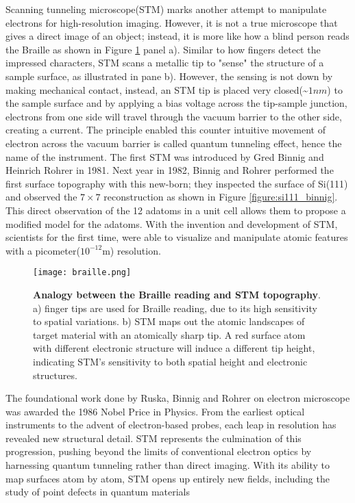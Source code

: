 Scanning tunneling microscope(STM) marks another attempt to manipulate electrons for high-resolution imaging. However, it is not a true microscope that gives a direct image of an object; instead, it is more like how a blind person reads the Braille as shown in Figure \ref{fig:braille} panel a). Similar to how fingers detect the impressed characters, \ac{STM} scans a metallic tip to "sense" the structure of a sample surface, as illustrated in pane b). However, the sensing is not down by making mechanical contact, instead, an \ac{STM} tip is placed very closed(\textasciitilde $1nm$) to the sample surface and by applying a bias voltage across the tip-sample junction, electrons from one side will travel through the vacuum barrier to the other side, creating a current. The principle enabled this counter intuitive movement of electron across the vacuum barrier is called quantum tunneling effect, hence the name of the instrument. The first \ac{STM} was introduced by Gred Binnig and Heinrich Rohrer in 1981. Next year in 1982, Binnig and Rohrer performed the first surface topography with this new-born; they inspected the surface of Si(111) and observed the $7 \times 7$ reconstruction as shown in Figure \ref{figure:si111_binnig}\cite{binnig77Reconstruction1983}. This direct observation of the 12 adatoms in a unit cell allows them to propose a modified model for the adatoms. With the invention and development of \ac{STM}, scientists for the first time, were able to visualize and manipulate atomic features with a picometer($10^{-12}$m) resolution.
\begin{figure}
	\centering
	\texttt{[image: braille.png]}
	\caption[\textbf{Analogy between the Braille reading and STM topography}]{\textbf{Analogy between the Braille reading and STM topography}. a) finger tips are used for Braille reading, due to its high sensitivity to spatial variations. b) \ac{STM} maps out the atomic landscapes of target material with an atomically sharp tip. A red surface atom with different electronic structure will induce a different tip height, indicating \ac{STM}'s sensitivity to both spatial height and electronic structures.}
	\label{fig:braille}
\end{figure}
The foundational work done by Ruska, Binnig and Rohrer on electron microscope was awarded the 1986 Nobel Price in Physics. From the earliest optical instruments to the advent of electron-based probes, each leap in resolution has revealed new structural detail. STM represents the culmination of this progression, pushing beyond the limits of conventional electron optics by harnessing quantum tunneling rather than direct imaging. With its ability to map surfaces atom by atom, STM opens up entirely new fields, including the study of point defects in quantum materials

